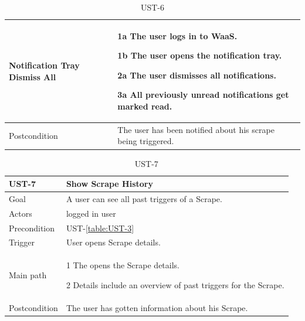 \documentclass[titlepage, 12pt]{article}
\newenvironment{packed_itemize}{
  \vspace{-\topsep}
  \begin{itemize}
    \setlength{\itemsep}{1pt}
    \setlength{\parskip}{0pt}
    \setlength{\parsep}{0pt}
  }{\end{itemize}}
\begin{document}
\begin{table}[H]
\begin{center}
\begin{tabular}{p{4cm}|p{10cm}}
      Notification Tray Dismiss All &
      \begin{packed_itemize}
        \item [1a] The user logs in to WaaS.
        \item [1b] The user opens the notification tray.
        \item [2a] The user dismisses all notifications.
        \item [3a] All previously unread notifications get marked read.
      \end{packed_itemize}                                                                   \\
      \hline
      Postcondition                 & The user has been notified about his scrape being triggered. \\
    \end{tabular}

    \vspace{-2mm}
    \caption{UST-6}
    \label{table:UST-6}

  \end{center}
\end{table}

\begin{table}[H]
  \begin{center}

    \begin{tabular}{p{4cm}|p{10cm}}
      \textbf{UST-7} & \textbf{Show Scrape History}                      \\
      \hline
      Goal           & A user can see all past triggers of a Scrape.     \\
      \hline
      Actors         & logged in user                                    \\
      \hline
      Precondition   & UST-\ref{table:UST-3}                             \\
      \hline
      Trigger        & User opens Scrape details.                        \\
      \hline
      Main path      &
      \begin{packed_itemize}
        \item [1] The opens the Scrape details.
        \item [2] Details include an overview of past triggers for the Scrape.
      \end{packed_itemize}                                         \\
      \hline
      Postcondition  & The user has gotten information about his Scrape. \\
    \end{tabular}

    \vspace{-2mm}
    \caption{UST-7}
    \label{table:UST-7}

  \end{center}
\end{table}
\end{document}
